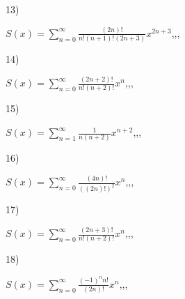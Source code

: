 \documentclass[11pt, ukrainian]{article}
\begin{document}
\par
\vspace{0.9cm}
13) \space 
{%
{$S(x)=\sum\limits_{n=0}^{\infty}{\frac{(2n)!}{n!(n+1)!(2n+3)}}{x^{{2n+3}}}$},,, \par \smallskip  
}
\par
\vspace{0.9cm}
14) \space 
{%
{$S(x)=\sum\limits_{n=0}^{\infty}{\frac{(2n+2)!}{n!(n+2)!}}{x^{n}}$},,, \par \smallskip  
}
\par
\vspace{0.9cm}
15) \space 
{%
{$S(x)=\sum\limits_{n=1}^{\infty}{\frac{1}{n(n+2)}}{x^{{n+2}}}$},,, \par \smallskip  
}
\par
\vspace{0.9cm}
16) \space 
{%
{$S(x)=\sum\limits_{n=0}^{\infty}{\frac{(4n)!}{{((2n)!)^2}}}{x^{{n}}}$},,, \par \smallskip  
}
\par
\vspace{0.9cm}
17) \space 
{%
{$S(x)=\sum\limits_{n=0}^{\infty}{\frac{(2n+3)!}{n!(n+2)!}}{x^{n}}$},,, \par \smallskip  
}
\par
\vspace{0.9cm}
18) \space 
{%
{$S(x)=\sum\limits_{n=0}^{\infty}{\frac{{(-1)^n}{n!}}{(2n)!}}{x^{{n}}}$},,, \par \smallskip  
}
\end{document}
